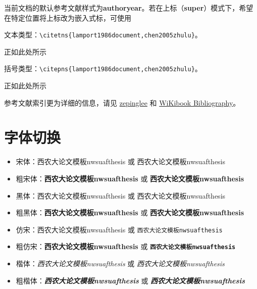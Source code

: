 当前文档的默认参考文献样式为\textbf{authoryear}。若在上标（\textbf{super}）模式下，希望在特定位置将上标改为嵌入式标，可使用

文本类型：\verb|\citetns{lamport1986document,chen2005zhulu}|。

正如此处所示

括号类型：\verb|\citepns{lamport1986document,chen2005zhulu}|。

正如此处所示

参考文献索引更为详细的信息，请见 \href{https://github.com/zepinglee/gbt7714-bibtex-style}{zepinglee} 和 \href{https://en.wikibooks.org/wiki/LaTeX/Bibliography_Management}{WiKibook Bibliography}。

\nocite{*}


\section{字体切换}

\begin{itemize}
    \item 宋体：西农大论文模板nwsuafthesis 或 \textrm{西农大论文模板nwsuafthesis}
    \item 粗宋体：{\bfseries 西农大论文模板nwsuafthesis} 或 \textbf{西农大论文模板nwsuafthesis}
    \item 黑体：{\sffamily 西农大论文模板nwsuafthesis} 或 \textsf{西农大论文模板nwsuafthesis}
    \item 粗黑体：{\bfseries\sffamily 西农大论文模板nwsuafthesis} 或 \textsf{\bfseries 西农大论文模板nwsuafthesis}
    \item 仿宋：{\ttfamily 西农大论文模板nwsuafthesis} 或 \texttt{西农大论文模板nwsuafthesis}
    \item 粗仿宋：{\bfseries\ttfamily 西农大论文模板nwsuafthesis} 或 \texttt{\bfseries 西农大论文模板nwsuafthesis}
    \item 楷体：{\itshape 西农大论文模板nwsuafthesis} 或 \textit{西农大论文模板nwsuafthesis}
    \item 粗楷体：{\bfseries\itshape 西农大论文模板nwsuafthesis} 或 \textit{\bfseries 西农大论文模板nwsuafthesis}
\end{itemize}





